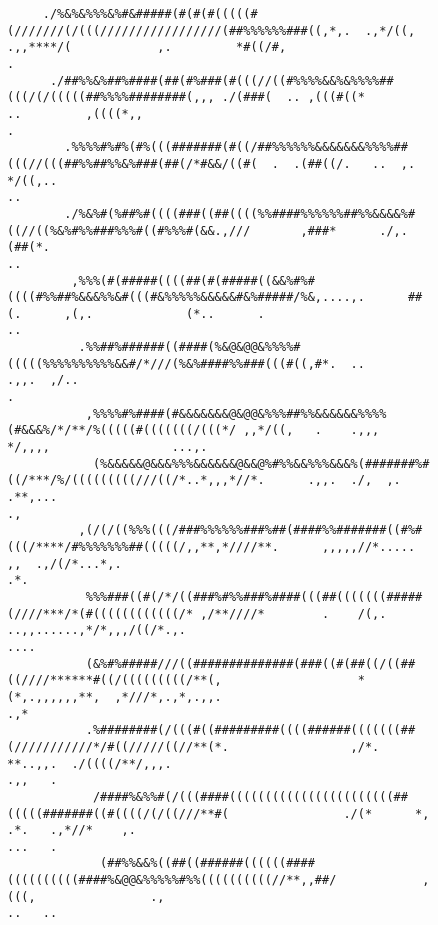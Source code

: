 \documentclass[a4paper, 20pt,fleqn]{article}
\begin{document}
\begin{figure}
\begin{verbatim}
     ./%&%&%%%&%#&#####(#(#(#(((((#(///////(/(((/////////////////(##%%%%%%###((,*,.  .,*/((, .,,****/(            ,.         *#((/#,                                                              .  
      ./##%%&%##%####(##(#%###(#(((//((#%%%%&&%&%%%%##(((/(/(((((##%%%%########(,,, ./(###(  .. ,(((#((*         ..         ,((((*,,                                                              .  
        .%%%%#%#%(#%(((#######(#((/##%%%%%%&&&&&&&%%%%##(((//(((##%%##%%&%###(##(/*#&&/((#(  .  .(##((/.   ..  ,.            */((,..                                                             ..  
        ./%&%#(%##%#((((###((##((((%%####%%%%%%##%%&&&&%#((//((%&%#%%###%%%#((#%%%#(&&.,///       ,###*      ./,.             (##(*.                                                             ..  
         ,%%%(#(#####((((##(#(#####((&&%#%#((((#%%##%&&&%%&#(((#&%%%%%&&&&&#&%#####/%&,....,.      ##(.      ,(,.             (*..      .                                                        ..  
          .%%##%######((####(%&@&@@&%%%%#(((((%%%%%%%%%%&&#/*///(%&%####%%###(((#((,#*.  ..           .,,.  ,/..                                                                                 .   
           ,%%%%#%####(#&&&&&&&@&@@&%%%##%%&&&&&&%%%%(#&&&%/*/**/%(((((#(((((((/(((*/ ,,*/((,   .    .,,,   */,,,,                 ...,.                                                             
            (%&&&&&@&&&%%%&&&&&&@&&@%#%%&&%%%&&&%(#######%#((/***/%/(((((((((///((/*..*,,,*//*.      .,,.  ./,  ,.                .**,...                                                       .,   
          ,(/(/((%%%(((/###%%%%%%###%##(####%%#######((#%#(((/****/#%%%%%%%##(((((/,,**,*////**.      ,,,,,//*.....        ,,  .,/(/*...*,.                                                     .*.  
           %%%###((#(/*/((###%#%%###%####(((##(((((((#####(////***/*(#((((((((((((/* ,/**////*        .    /(,. ..,,......,*/*,,,/((/*.,.                                                   ....     
           (&%#%#####///((##############(###((#(##((/((##((////******#((/(((((((((/**(,                   *(*,.,,,,,,**,  ,*///*,.,*,.,,.                                                    .,*     
           .%########(/(((#((#########((((######(((((((##(///////////*/#((/////((//**(*.                 ,/*.    **..,,.  ./((((/**/,,,.                                                     .,,   . 
            /####%&%%#(/(((####(((((((((((((((((((((((##(((((#######((#((((/(/((///**#(                ./(*      *,  .*.   .,*//*    ,.                                                      ...   . 
             (##%%&&%((##((######((((((####((((((((((####%&@@&%%%%%#%%((((((((((//**,,##/            ,(((,                .,                                                                  ..   ..

\end{verbatim}
\end{figure}
\end{document}
